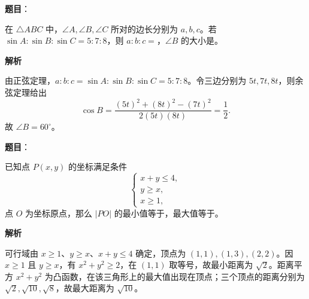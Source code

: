 \begin{answer}

\textbf{题目}：

在 $\triangle ABC$ 中，$\angle A,\angle B,\angle C$ 所对的边长分别为 $a,b,c$。若 $\sin A:\sin B:\sin C=5:7:8$，则 $a:b:c=$\gkblank{}，$\angle B$ 的大小是\gkblank{}。

\textbf{解析}

由正弦定理，$a:b:c=\sin A:\sin B:\sin C=5:7:8$。令三边分别为 $5t,7t,8t$，则余弦定理给出
\nopagebreak[4]
\[
\cos B=\frac{(5t)^2+(8t)^2-(7t)^2}{2(5t)(8t)}=\frac12.
\]
故 $\angle B=60^\circ$。


\end{answer}
\begin{answer}

\textbf{题目}：

已知点 $P(x,y)$ 的坐标满足条件
\nopagebreak[4]
\[
\begin{cases}
x+y\le 4,\\
y\ge x,\\
x\ge 1,
\end{cases}
\]
点 $O$ 为坐标原点，那么 $|PO|$ 的最小值等于\gkblank{}，最大值等于\gkblank{}。

\textbf{解析}

可行域由 $x\ge1$、$y\ge x$、$x+y\le4$ 确定，顶点为 $(1,1),(1,3),(2,2)$。因 $x\ge1$ 且 $y\ge x$，有 $x^2+y^2\ge2$，在 $(1,1)$ 取等号，故最小距离为 $\sqrt2$。距离平方 $x^2+y^2$ 为凸函数，在该三角形上的最大值出现在顶点；三个顶点的距离分别为 $\sqrt2,\sqrt{10},\sqrt8$，故最大距离为 $\sqrt{10}$。


\end{answer}
